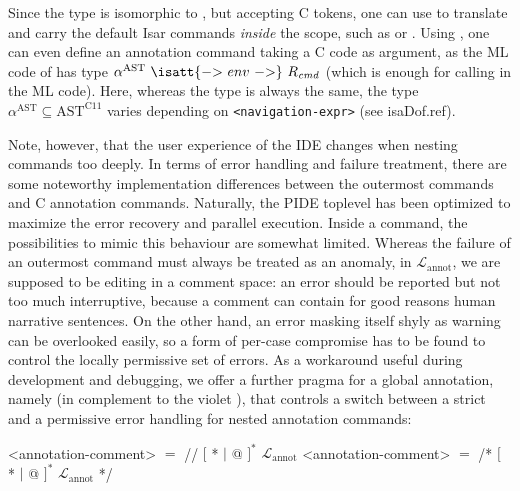 \begin{isabellebody}
\begin{isamarkuptext}
Since the type  is isomorphic to ,
but accepting C tokens, one can use  to translate and carry
the default Isar commands \emph{inside} the  scope, such as  or
. Using , one can even
define an annotation command  taking a C code as argument, as the ML
code of  has type
$\alpha^{\text{AST}}~\isatt{{\char`\-}{\char`\>}\ env\ {\char`\-}{\char`\>}}~R_\text{\emph{cmd}}$ (which is enough for
calling  in the ML code). Here, whereas the type
 is always the same, the type $\alpha^{\text{AST}} \subseteq
\text{AST}^\text{C11}$ varies depending on {\footnotesize\texttt{<navigation-expr>}} (see \csname isaDof.ref).%
\end{isamarkuptext}\isamarkuptrue%
%
\begin{isamarkuptext}%
Note, however, that the user experience of the IDE changes when nesting commands too
deeply. In terms of error handling and failure treatment, there are some noteworthy implementation
differences between the outermost commands and C annotation commands. Naturally, the PIDE toplevel
has been optimized to maximize the error recovery and parallel execution. Inside a command, the
possibilities to mimic this behaviour are somewhat limited. Whereas the failure of an outermost
command must always be treated as an anomaly, in $\mathcal{L}_\text{annot}$, we are supposed to be
editing in a comment space: an error should be reported but not too much interruptive, because a
comment can contain for good reasons human narrative sentences. On the other hand, an error masking
itself shyly as warning can be overlooked easily, so a form of per-case compromise has to be found
to control the locally permissive set of errors. As a workaround useful during development and
debugging, we offer a further pragma for a global annotation, namely \isa{{\isacharasterisk}}
(in complement to the violet \isa{{\isacharat}}), that controls a switch between a
strict and a permissive error handling for nested annotation commands:
\begin{isar}
    <annotation-comment> $=$ // $[$ * $|$ @ $]^*$ $\mathcal{L}_\text{annot}$
    <annotation-comment> $=$ /* $[$ * $|$ @ $]^*$ $\mathcal{L}_\text{annot}$ */
\end{isar}%

\end{isamarkuptext}
\end{isabellebody}
